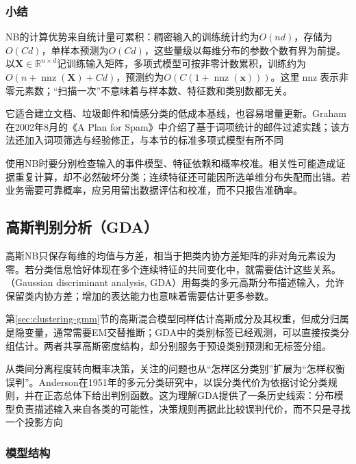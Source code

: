 \subsubsection{小结}
\label{sec:classification-naive-bayes-summary}

NB的计算优势来自统计量可累积：稠密输入的训练统计约为$O(nd)$，存储为$O(Cd)$，单样本预测为$O(Cd)$，这些量级以每维分布的参数个数有界为前提。以$\bm{X}\in\mathbb{R}^{n\times d}$记训练输入矩阵，多项式模型可按非零计数累积，训练约为$O(n+\operatorname{nnz}(\bm{X})+Cd)$，预测约为$O(C(1+\operatorname{nnz}(\bm{x})))$。这里$\operatorname{nnz}$表示非零元素数；“扫描一次”不意味着与样本数、特征数和类别数都无关。

它适合建立文档、垃圾邮件和情感分类的低成本基线，也容易增量更新。Graham在2002年8月的《A Plan for Spam》中介绍了基于词项统计的邮件过滤实践；该方法还加入词项筛选与经验修正，与本节的标准多项式模型有所不同

使用NB时要分别检查输入的事件模型、特征依赖和概率校准。相关性可能造成证据重复计算，却不必然破坏分类；连续特征还可能因所选单维分布失配而出错。若业务需要可靠概率，应另用留出数据评估和校准，而不只报告准确率。

\subsection{高斯判别分析（GDA）}
\label{sec:classification-gda}

高斯NB只保存每维的均值与方差，相当于把类内协方差矩阵的非对角元素设为零。若分类信息恰好体现在多个连续特征的共同变化中，就需要估计这些关系。（Gaussian discriminant analysis, GDA）用每类的多元高斯分布描述输入，允许保留类内协方差；增加的表达能力也意味着需要估计更多参数。

第\ref{sec:clustering-gmm}节的高斯混合模型同样估计高斯成分及其权重，但成分归属是隐变量，通常需要EM交替推断；GDA中的类别标签已经观测，可以直接按类分组估计。两者共享高斯密度结构，却分别服务于预设类别预测和无标签分组。

从类间分离程度转向概率决策，关注的问题也从“怎样区分类别”扩展为“怎样权衡误判”。Anderson在1951年的多元分类研究中，以误分类代价为依据讨论分类规则，并在正态总体下给出判别函数。这为理解GDA提供了一条历史线索：分布模型负责描述输入来自各类的可能性，决策规则再据此比较误判代价，而不只是寻找一个投影方向

\subsubsection{模型结构}
\label{sec:classification-gda-structure}

